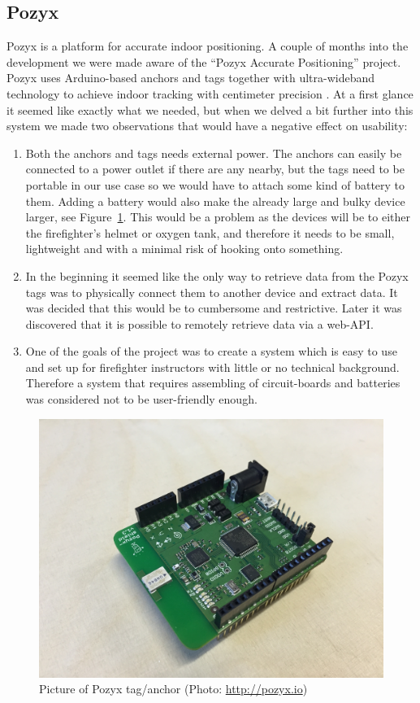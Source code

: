 \documentclass[../Main/thesis.tex]{subfiles}
\begin{document}
\subsection{Pozyx}
Pozyx is a platform for accurate indoor positioning.
A couple of months into the development we were made aware of the ``Pozyx Accurate Positioning'' project.
Pozyx uses Arduino-based anchors and tags together with ultra-wideband technology to achieve indoor tracking with centimeter precision \citep{Pozyx2017}.
At a first glance it seemed like exactly what we needed, but when we delved a bit further into this system we made two observations that would have a negative effect on usability:
\begin{enumerate}
	\item{Both the anchors and tags needs external power. 
		The anchors can easily be connected to a power outlet if there are any nearby, but the tags need to be portable in our use case so we would have to attach some kind of battery to them.
		Adding a battery would also make the already large and bulky device larger, see Figure~\ref{fig:pozyx_tag}.
		This would be a problem as the devices will be to either the firefighter's helmet or oxygen tank, and therefore it needs to be small, lightweight and with a minimal risk of hooking onto something.
	}

	\item{In the beginning it seemed like the only way to retrieve data from the Pozyx tags was to physically connect them to another device and extract data.
		It was decided that this would be to cumbersome and restrictive.
		Later it was discovered that it is possible to remotely retrieve data via a web-API.}

	\item{One of the goals of the project was to create a system which is easy to use and set up for firefighter instructors with little or no technical background.
		Therefore a system that requires assembling of circuit-boards and batteries was considered not to be user-friendly enough.}
\end{enumerate}

\begin{figure}
	\centering
	\includegraphics[width=0.5\linewidth]{../fig/pozyx_tag}
	\caption[Picture of Pozyx tag/anchor]{Picture of Pozyx tag/anchor (Photo: \url{http://pozyx.io})}
	\label{fig:pozyx_tag}
\end{figure}
\end{document}
